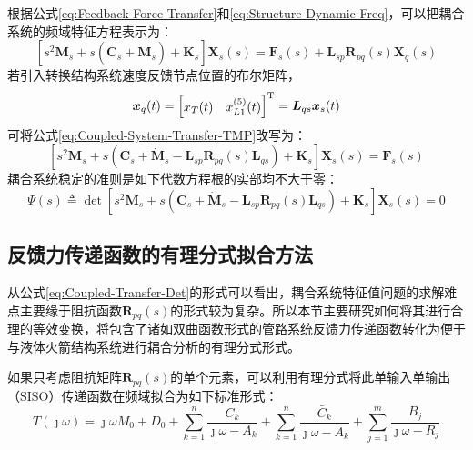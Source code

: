 根据公式\eqref{eq:Feedback-Force-Transfer}和\eqref{eq:Structure-Dynamic-Freq}，可以把耦合系统的频域特征方程表示为：
\begin{equation}
  \label{eq:Coupled-System-Transfer-TMP}
  \left[s^2 \boldsymbol{M}_s+ s(\boldsymbol{C}_s+\boldsymbol{\dot{M}}_s)+ \boldsymbol{K}_s \right]\boldsymbol{X}_s(s)=\boldsymbol{F}_s(s)+ \boldsymbol{L}_{sp} \boldsymbol{R}_{pq}(s)\boldsymbol{\dot{X}}_q(s)
\end{equation}
若引入转换结构系统速度反馈节点位置的布尔矩阵，
\begin{displaymath}
  \boldsymbol{x}_q(t)=
  \left[ \begin{matrix}
      {x}_T(t) & {x}_{L1}^{(5)}(t)
    \end{matrix} \right]^{\mathrm{T}}=
  \boldsymbol{L}_{qs} \boldsymbol{x}_s(t)
\end{displaymath}
可将公式\eqref{eq:Coupled-System-Transfer-TMP}改写为：
\begin{equation}
  \label{eq:Coupled-System-Transfer}
  \left[s^2 \boldsymbol{M}_s+ s\left(\boldsymbol{C}_s+\boldsymbol{\dot{M}}_s
    -\boldsymbol{L}_{sp} \boldsymbol{R}_{pq}(s)\boldsymbol{L}_{qs}\right)+ \boldsymbol{K}_s \right]\boldsymbol{X}_s(s)=\boldsymbol{F}_s(s)
\end{equation}
耦合系统稳定的准则是如下代数方程根的实部均不大于零：
\begin{equation}
  \label{eq:Coupled-Transfer-Det}
  \Psi (s) \triangleq \det
  \left[s^2 \boldsymbol{M}_s+ s\left(\boldsymbol{C}_s+\boldsymbol{\dot{M}}_s
    -\boldsymbol{L}_{sp} \boldsymbol{R}_{pq}(s)\boldsymbol{L}_{qs}\right)+ \boldsymbol{K}_s \right]\boldsymbol{X}_s(s)=0
\end{equation}

\subsection{反馈力传递函数的有理分式拟合方法}
从公式\eqref{eq:Coupled-Transfer-Det}的形式可以看出，耦合系统特征值问题的求解难点主要缘于阻抗函数$\boldsymbol{R}_{pq}(s)$的形式较为复杂。所以本节主要研究如何将其进行合理的等效变换，将包含了诸如双曲函数形式的管路系统反馈力传递函数转化为便于与液体火箭结构系统进行耦合分析的有理分式形式。

如果只考虑阻抗矩阵$\boldsymbol{R}_{pq}(s)$的单个元素，可以利用有理分式将此单输入单输出（SISO）传递函数在频域拟合为如下标准形式\cite{Gustavsen:1999, Zeng:2006}：
\begin{equation}
  \label{eq:Standard-SISO-Freq}
  T(\jmath\omega)=\jmath\omega M_0+ D_0+ \sum_{k=1}^{n}\frac{C_k}{\jmath\omega-A_k}+ \sum_{k=1}^{n}\frac{\bar{C}_k}{\jmath\omega- \bar{A}_k}+ \sum_{j=1}^{m} \frac{B_j}{\jmath\omega -R_j}
\end{equation}

